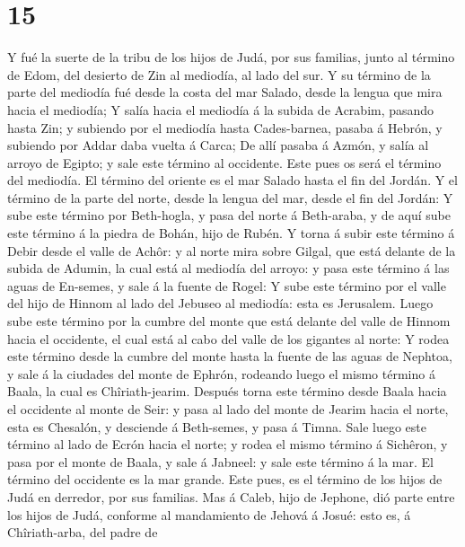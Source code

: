 \hypertarget{section-14}{%
\section{15}\label{section-14}}

 Y fué la suerte de la tribu de los hijos de Judá, por sus
familias, junto al término de Edom, del desierto de Zin al mediodía, al
lado del sur.  Y su término de la parte del mediodía fué
desde la costa del mar Salado, desde la lengua que mira hacia el
mediodía;  Y salía hacia el mediodía á la subida de Acrabim,
pasando hasta Zin; y subiendo por el mediodía hasta Cades-barnea, pasaba
á Hebrón, y subiendo por Addar daba vuelta á Carca;  De allí
pasaba á Azmón, y salía al arroyo de Egipto; y sale este término al
occidente. Este pues os será el término del mediodía.  El
término del oriente es el mar Salado hasta el fin del Jordán. Y el
término de la parte del norte, desde la lengua del mar, desde el fin del
Jordán:  Y sube este término por Beth-hogla, y pasa del
norte á Beth-araba, y de aquí sube este término á la piedra de Bohán,
hijo de Rubén.  Y torna á subir este término á Debir desde
el valle de Achôr: y al norte mira sobre Gilgal, que está delante de la
subida de Adumin, la cual está al mediodía del arroyo: y pasa este
término á las aguas de En-semes, y sale á la fuente de Rogel:
 Y sube este término por el valle del hijo de Hinnom al lado
del Jebuseo al mediodía: esta es Jerusalem. Luego sube este término por
la cumbre del monte que está delante del valle de Hinnom hacia el
occidente, el cual está al cabo del valle de los gigantes al norte:
 Y rodea este término desde la cumbre del monte hasta la
fuente de las aguas de Nephtoa, y sale á la ciudades del monte de
Ephrón, rodeando luego el mismo término á Baala, la cual es
Chîriath-jearim.  Después torna este término desde Baala
hacia el occidente al monte de Seir: y pasa al lado del monte de Jearim
hacia el norte, esta es Chesalón, y desciende á Beth-semes, y pasa á
Timna.  Sale luego este término al lado de Ecrón hacia el
norte; y rodea el mismo término á Sichêron, y pasa por el monte de
Baala, y sale á Jabneel: y sale este término á la mar.  El
término del occidente es la mar grande. Este pues, es el término de los
hijos de Judá en derredor, por sus familias.  Mas á Caleb,
hijo de Jephone, dió parte entre los hijos de Judá, conforme al
mandamiento de Jehová á Josué: esto es, á Chîriath-arba, del padre de
